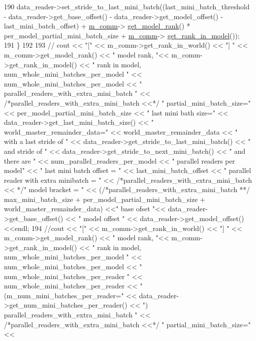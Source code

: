 \begin{DoxyCode}
190     data\_reader->set\_stride\_to\_last\_mini\_batch((last\_mini\_batch\_threshold - data\_reader->get\_base\_offset() 
      - data\_reader->get\_model\_offset() - last\_mini\_batch\_offset) + \hyperlink{classlbann_1_1generic__io__buffer_a2e4a46c85c8b30e10b1cc5acaa2c4cca}{m\_comm}->
      \hyperlink{classlbann_1_1lbann__comm_a6422f70c92bed0b78179facc52b066f7}{get\_model\_rank}() * per\_model\_partial\_mini\_batch\_size + \hyperlink{classlbann_1_1generic__io__buffer_a2e4a46c85c8b30e10b1cc5acaa2c4cca}{m\_comm}->
      \hyperlink{classlbann_1_1lbann__comm_a789453454468a3b70de768537c50ca52}{get\_rank\_in\_model}());
191   \}
192 
193   \textcolor{comment}{//  cout << "[" << m\_comm->get\_rank\_in\_world() << "] " << m\_comm->get\_model\_rank() << " model rank, "<<
       m\_comm->get\_rank\_in\_model() << " rank in model, num\_whole\_mini\_batches\_per\_model " <<
       num\_whole\_mini\_batches\_per\_model << " parallel\_readers\_with\_extra\_mini\_batch " << /*parallel\_readers\_with\_extra\_mini\_batch <<*/ "
       partial\_mini\_batch\_size=" << per\_model\_partial\_mini\_batch\_size << " last mini bath size=" <<
       data\_reader->get\_last\_mini\_batch\_size() << " world\_master\_remainder\_data=" << world\_master\_remainder\_data << " with a last
       stride of " << data\_reader->get\_stride\_to\_last\_mini\_batch() << " and stride of " <<
       data\_reader->get\_stride\_to\_next\_mini\_batch() << " and there are " << num\_parallel\_readers\_per\_model << " parallel readers per model"
       << " last mini batch offset = " << last\_mini\_batch\_offset <<  " parallel reader with extra minibatch = " <<
       /*parallel\_readers\_with\_extra\_mini\_batch << */" model bracket = " <<
       (/*parallel\_readers\_with\_extra\_mini\_batch **/ max\_mini\_batch\_size + per\_model\_partial\_mini\_batch\_size + world\_master\_remainder\_data) <<" base ofset
       "<< data\_reader->get\_base\_offset() << " model offset " << data\_reader->get\_model\_offset() <<endl;}
194 \textcolor{comment}{//cout << "[" << m\_comm->get\_rank\_in\_world() << "] " << m\_comm->get\_model\_rank() << " model rank, "<<
       m\_comm->get\_rank\_in\_model() << " rank in model, num\_whole\_mini\_batches\_per\_model " <<
       num\_whole\_mini\_batches\_per\_model << " num\_whole\_mini\_batches\_per\_reader " << num\_whole\_mini\_batches\_per\_reader <<
       "(m\_num\_mini\_batches\_per\_reader=" << data\_reader->get\_num\_mini\_batches\_per\_reader() << ") parallel\_readers\_with\_extra\_mini\_batch
       " << /*parallel\_readers\_with\_extra\_mini\_batch <<*/ " partial\_mini\_batch\_size=" <<
}
\end{DoxyCode}

